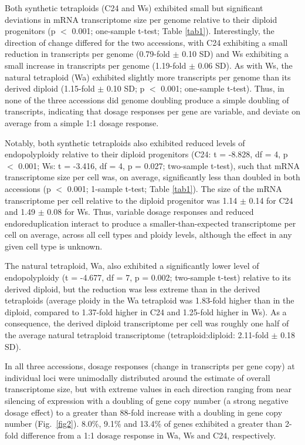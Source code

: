 \documentclass[11pt]{article}
\begin{document}
Both synthetic tetraploids (C24 and Ws) exhibited small but significant deviations in mRNA transcriptome size per genome relative to their diploid progenitors (p $<$ 0.001; one-sample t-test; Table \ref{tab1}). Interestingly, the direction of change differed for the two accessions, with C24 exhibiting a small reduction in transcripts per genome (0.79-fold $\pm$ 0.10 SD) and Ws exhibiting a small increase in transcripts per genome (1.19-fold $\pm$ 0.06 SD). As with Ws, the natural tetraploid (Wa) exhibited slightly more transcripts per genome than its derived diploid (1.15-fold $\pm$ 0.10 SD; p $<$ 0.001; one-sample t-test). Thus, in none of the three accessions did genome doubling produce a simple doubling of transcripts, indicating that dosage responses per gene are variable, and deviate on average from a simple 1:1 dosage response.

Notably, both synthetic tetraploids also exhibited reduced levels of endopolyploidy relative to their diploid progenitors (C24: t = -8.828, df = 4, p $<$ 0.001; Ws: t = -3.416, df = 4, p = 0.027; two-sample t-test), such that mRNA transcriptome size per cell was, on average, significantly less than doubled in both accessions (p $<$ 0.001; 1-sample t-test; Table \ref{tab1}).
The size of the mRNA transcriptome per cell relative to the diploid progenitor was 1.14 $\pm$ 0.14 for C24 and 1.49 $\pm$ 0.08 for Ws.
Thus, variable dosage responses and reduced endoreduplication interact to produce a smaller-than-expected transcriptome per cell on average, across all cell types and ploidy levels, although the effect in any given cell type is unknown.

The natural tetraploid, Wa, also exhibited a significantly lower level of endopolyploidy (t = -4.677, df = 7, p = 0.002; two-sample t-test) relative to its derived diploid, but the reduction was less extreme than in the derived tetraploids (average ploidy in the Wa tetraploid was 1.83-fold higher than in the diploid, compared to 1.37-fold higher in C24 and 1.25-fold higher in Ws).
As a consequence, the derived diploid transcriptome per cell was roughly one half of the average natural tetraploid transcriptome (tetraploid:diploid: 2.11-fold $\pm$ 0.18 SD).

In all three accessions, dosage responses (change in transcripts per gene copy) at individual loci were unimodally distributed around the estimate of overall transcriptome size, but with extreme values in each direction ranging from near silencing of expression with a doubling of gene copy number (a strong negative dosage effect) to a greater than 88-fold increase with a doubling in gene copy number (Fig.~\ref{fig2}). 8.0\%, 9.1\% and 13.4\% of genes exhibited a greater than 2-fold difference from a 1:1 dosage response in Wa, Ws and C24, respectively.
\end{document}
